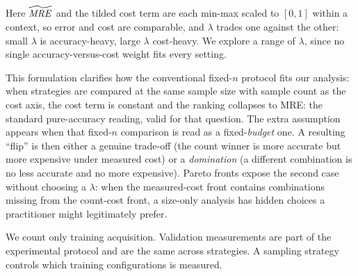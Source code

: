 Here $\widetilde{\mathit{MRE}}$ and the tilded cost term are each min-max scaled to
$[0,1]$ within a context, so error and cost are comparable, and $\lambda$ trades
one against the other: small $\lambda$ is accuracy-heavy, large $\lambda$
cost-heavy. We explore a range of $\lambda$, since no single accuracy-versus-cost
weight fits every setting.

This formulation clarifies how the conventional fixed-$n$ protocol fits our
analysis: when strategies are compared at the same sample size with sample count
as the cost axis, the cost term is constant and the ranking collapses to
MRE: the standard pure-accuracy reading, valid for that question. The extra
assumption appears when that fixed-$n$ comparison is read as a fixed-\emph{budget}
one. A resulting ``flip'' is then either a genuine trade-off (the count winner is
more accurate but more expensive under measured cost) or a \emph{domination} (a
different combination is no less accurate and no more expensive). Pareto fronts
expose the second case without choosing a $\lambda$: when the measured-cost front
contains combinations missing from the count-cost front, a size-only analysis has
hidden choices a practitioner might legitimately prefer.

We count only training acquisition. Validation measurements are part of the
experimental protocol and are the same across strategies. A sampling strategy
controls which training configurations is measured.
